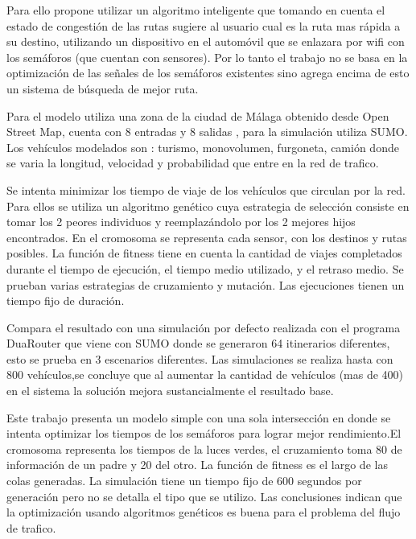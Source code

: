 \begin{itemize}
\begin{item}
Para ello propone utilizar un algoritmo inteligente que tomando en cuenta el estado de congestión de las rutas sugiere al usuario cual es la ruta mas rápida a su destino, utilizando un dispositivo en el automóvil que se enlazara por wifi con los semáforos (que cuentan con sensores). Por lo tanto el trabajo no se basa en la optimización de las señales de los semáforos existentes sino agrega encima de esto un sistema de búsqueda de mejor ruta.

Para el modelo utiliza una zona  de la ciudad de Málaga obtenido desde Open Street Map, cuenta con 8 entradas y 8 salidas , para la simulación utiliza SUMO. Los vehículos modelados son : turismo, monovolumen, furgoneta, camión donde se varia la longitud, velocidad y probabilidad que entre en la red de trafico.

Se intenta minimizar los tiempo de viaje de los vehículos que circulan por la red. Para ellos se utiliza un algoritmo genético cuya estrategia de selección consiste en tomar los 2 peores individuos y reemplazándolo por los 2 mejores hijos encontrados. En el cromosoma se representa cada sensor, con los destinos y rutas posibles. La función de fitness tiene en cuenta la cantidad de viajes completados durante el tiempo de ejecución, el tiempo medio utilizado, y el retraso medio. Se prueban varias estrategias de cruzamiento y mutación. Las ejecuciones tienen un tiempo fijo de duración.


Compara el resultado con una simulación por defecto realizada con el programa DuaRouter que viene con SUMO donde se generaron 64 itinerarios diferentes, esto se prueba en 3 escenarios diferentes. Las simulaciones se realiza hasta con 800 vehículos,se concluye que al aumentar la cantidad de vehículos (mas de 400) en el sistema la solución mejora sustancialmente el resultado base.

	\end{item}	
	
	
	\begin{item}
Este trabajo presenta un modelo simple con una sola intersección en donde se intenta optimizar los tiempos de los semáforos para lograr mejor rendimiento.El cromosoma representa los tiempos de la luces verdes, el cruzamiento toma 80 de información de un padre y 20 del otro. La función de fitness es el largo de las colas generadas. La simulación tiene un tiempo fijo de 600 segundos por generación pero no se detalla el tipo que se utilizo. Las conclusiones indican que la optimización usando algoritmos genéticos  es buena para el problema del flujo de trafico.	
	\end{item}	



\end{itemize}
